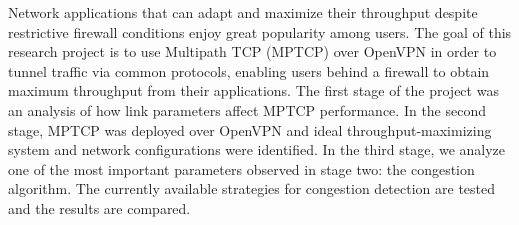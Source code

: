 Network applications that can adapt and maximize their throughput despite
restrictive firewall conditions enjoy great popularity among users. The goal
of this research project is to use Multipath TCP (MPTCP) over OpenVPN in order
to tunnel traffic via common protocols, enabling users behind a firewall to
obtain maximum throughput from their applications. The first stage of the
project was an analysis of how link parameters affect MPTCP performance. In
the second stage, MPTCP was deployed over OpenVPN and ideal
throughput-maximizing system and network configurations were identified. In
the third stage, we analyze one of the most important parameters observed in
stage two: the congestion algorithm. The currently available strategies for
congestion detection are tested and the results are compared.
